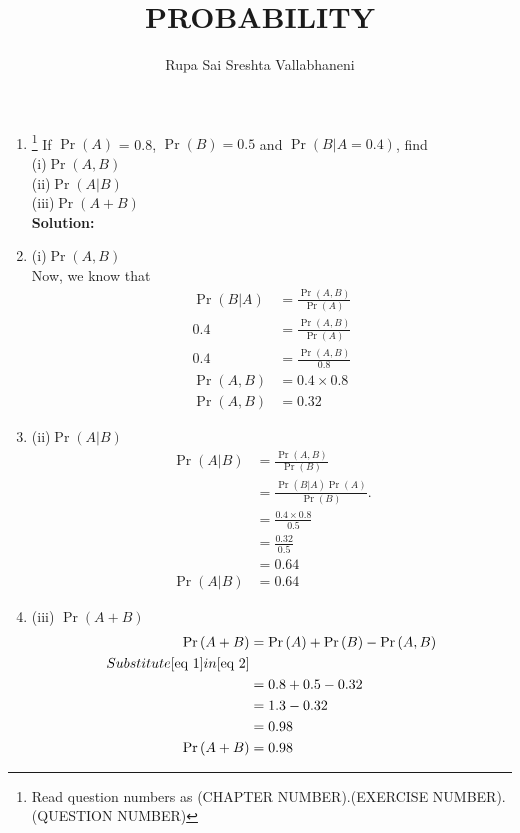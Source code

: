 \documentclass{article}
\newcommand{\solution}{\noindent \textbf{Solution: }}
\providecommand{\pr}[1]{\ensuremath{\Pr\left(#1\right)}}
\begin{document}
\title{PROBABILITY}
\author{\Large Rupa Sai Sreshta Vallabhaneni}
\date{}

\maketitle
\begin{enumerate}[label=13.\arabic{enumi}.\arabic{enumii}]%
\setcounter{enumi}{0}
\setcounter{enumii}{3}

\item \footnote{Read question numbers as (CHAPTER NUMBER).(EXERCISE NUMBER).(QUESTION NUMBER)}  If $\pr{A}$ = 0.8, $\pr{B} = 0.5$ and $\pr{B \vert A = 0.4}$, find  \\
(i)$\pr{A,B}$ 
\\
 (ii)$\pr{A \vert B}$
\\
 (iii)$\pr{A+B}$
\\[1ex]

\solution
\item (i)$\pr{A,B}$
 \\
  Now, we know that
 \begin{align}
\pr{B \vert A} &= \frac{\pr{A , B}}{\pr{A}}
 \\
 0.4 &= \frac{\pr{A, B}}{\pr{A}}
 \\
 0.4 &= \frac{\pr{A, B}}{0.8}
 \\
 \pr{A,B} &= 0.4 \times 0.8
 \\
 \pr{A,B} &= 0.32
 \label{eq 1}
 \end{align}
 \item
 (ii)$\pr{A \vert B}$
 \begin{align}
 \pr{A \vert B} &= \frac{\pr{A,B}}{\pr{B}}
 \\
 &= \frac{\pr{ B \vert A}\pr{A}}{\pr{B}}.
 \\
  &= \frac{0.4 \times 0.8}{0.5}
 \\
 &= \frac{0.32}{0.5}
 \\
 &= 0.64
 \\
\pr{A \vert B} &= 0.64
 \end{align}
 \item
 (iii) $\pr{A+B}$
 \begin{align}
 \pr{A+B} &= \pr{A}+\pr{B}-\pr{A, B} 
 \label{eq 2}
 \\
 Substitute \eqref{eq 1}  in \eqref{eq 2}
 \\
 &=0.8+0.5-0.32
 \\
 &=1.3-0.32
 \\
 &= 0.98
 \\
 \pr{A+B} &= 0.98
 \end{align}
\end{enumerate}
\end{document}
